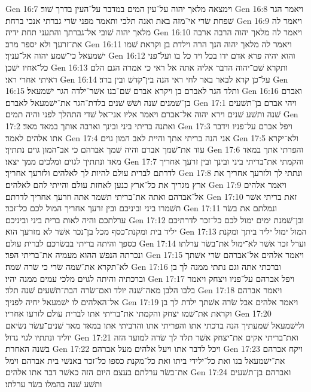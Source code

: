 Gen 16:7  וימצאה מלאך יהוה על־עין המים במדבר על־העין בדרך שׁור׃
Gen 16:8  ויאמר הגר שׁפחת שׂרי אי־מזה באת ואנה תלכי ותאמר מפני שׂרי גברתי אנכי ברחת׃
Gen 16:9  ויאמר לה מלאך יהוה שׁובי אל־גברתך והתעני תחת ידיה׃
Gen 16:10  ויאמר לה מלאך יהוה הרבה ארבה את־זרעך ולא יספר מרב׃
Gen 16:11  ויאמר לה מלאך יהוה הנך הרה וילדת בן וקראת שׁמו ישׁמעאל כי־שׁמע יהוה אל־עניך׃
Gen 16:12  והוא יהיה פרא אדם ידו בכל ויד כל בו ועל־פני כל־אחיו ישׁכן׃
Gen 16:13  ותקרא שׁם־יהוה הדבר אליה אתה אל ראי כי אמרה הגם הלם ראיתי אחרי ראי׃
Gen 16:14  על־כן קרא לבאר באר לחי ראי הנה בין־קדשׁ ובין ברד׃
Gen 16:15  ותלד הגר לאברם בן ויקרא אברם שׁם־בנו אשׁר־ילדה הגר ישׁמעאל׃
Gen 16:16  ואברם בן־שׁמנים שׁנה ושׁשׁ שׁנים בלדת־הגר את־ישׁמעאל לאברם׃
Gen 17:1  ויהי אברם בן־תשׁעים שׁנה ותשׁע שׁנים וירא יהוה אל־אברם ויאמר אליו אני־אל שׁדי התהלך לפני והיה תמים׃
Gen 17:2  ואתנה בריתי ביני ובינך וארבה אותך במאד מאד׃
Gen 17:3  ויפל אברם על־פניו וידבר אתו אלהים לאמר׃
Gen 17:4  אני הנה בריתי אתך והיית לאב המון גוים׃
Gen 17:5  ולא־יקרא עוד את־שׁמך אברם והיה שׁמך אברהם כי אב־המון גוים נתתיך׃
Gen 17:6  והפרתי אתך במאד מאד ונתתיך לגוים ומלכים ממך יצאו׃
Gen 17:7  והקמתי את־בריתי ביני ובינך ובין זרעך אחריך לדרתם לברית עולם להיות לך לאלהים ולזרעך אחריך׃
Gen 17:8  ונתתי לך ולזרעך אחריך את ארץ מגריך את כל־ארץ כנען לאחזת עולם והייתי להם לאלהים׃
Gen 17:9  ויאמר אלהים אל־אברהם ואתה את־בריתי תשׁמר אתה וזרעך אחריך לדרתם׃
Gen 17:10  זאת בריתי אשׁר תשׁמרו ביני וביניכם ובין זרעך אחריך המול לכם כל־זכר׃
Gen 17:11  ונמלתם את בשׂר ערלתכם והיה לאות ברית ביני וביניכם׃
Gen 17:12  ובן־שׁמנת ימים ימול לכם כל־זכר לדרתיכם יליד בית ומקנת־כסף מכל בן־נכר אשׁר לא מזרעך הוא׃
Gen 17:13  המול ימול יליד ביתך ומקנת כספך והיתה בריתי בבשׂרכם לברית עולם׃
Gen 17:14  וערל זכר אשׁר לא־ימול את־בשׂר ערלתו ונכרתה הנפשׁ ההוא מעמיה את־בריתי הפר׃
Gen 17:15  ויאמר אלהים אל־אברהם שׂרי אשׁתך לא־תקרא את־שׁמה שׂרי כי שׂרה שׁמה׃
Gen 17:16  וברכתי אתה וגם נתתי ממנה לך בן וברכתיה והיתה לגוים מלכי עמים ממנה יהיו׃
Gen 17:17  ויפל אברהם על־פניו ויצחק ויאמר בלבו הלבן מאה־שׁנה יולד ואם־שׂרה הבת־תשׁעים שׁנה תלד׃
Gen 17:18  ויאמר אברהם אל־האלהים לו ישׁמעאל יחיה לפניך׃
Gen 17:19  ויאמר אלהים אבל שׂרה אשׁתך ילדת לך בן וקראת את־שׁמו יצחק והקמתי את־בריתי אתו לברית עולם לזרעו אחריו׃
Gen 17:20  ולישׁמעאל שׁמעתיך הנה ברכתי אתו והפריתי אתו והרביתי אתו במאד מאד שׁנים־עשׂר נשׂיאם יוליד ונתתיו לגוי גדול׃
Gen 17:21  ואת־בריתי אקים את־יצחק אשׁר תלד לך שׂרה למועד הזה בשׁנה האחרת׃
Gen 17:22  ויכל לדבר אתו ויעל אלהים מעל אברהם׃
Gen 17:23  ויקח אברהם את־ישׁמעאל בנו ואת כל־ילידי ביתו ואת כל־מקנת כספו כל־זכר באנשׁי בית אברהם וימל את־בשׂר ערלתם בעצם היום הזה כאשׁר דבר אתו אלהים׃
Gen 17:24  ואברהם בן־תשׁעים ותשׁע שׁנה בהמלו בשׂר ערלתו׃
